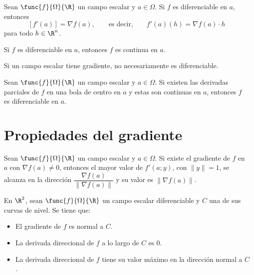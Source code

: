 \documentclass[a4,11pt]{aleph-notas}
\begin{document}
\begin{teo}
    Sean $\func{f}{\Omega}{\R}$ un campo escalar y $a\in \Omega$. Si $f$ es diferenciable en $a$, entonces
    \[
        [f'(a)]=\nabla f(a),\qquad\text{es decir,}\qquad f'(a)(h)=\nabla f(a)\cdot h
    \]
    para todo $h\in\R^n$.
\end{teo}

\begin{teo}
    Si $f$ es diferenciable en $a$, entonces $f$ es continua en $a$.
\end{teo}

\begin{advertencia}
    Si un campo escalar tiene gradiente, no necesariamente es diferenciable.
\end{advertencia}

\begin{teo}
    Sean $\func{f}{\Omega}{\R}$ un campo escalar y $a\in \Omega$. Si existen las derivadas parciales de $f$ en una bola de centro en $a$ y estas son continuas en $a$, entonces $f$ es diferenciable en $a$.
\end{teo}

\section{Propiedades del gradiente}

\begin{prop}
    Sean $\func{f}{\Omega}{\R}$ un campo escalar y $a\in \Omega$. Si existe el gradiente de $f$ en $a$ con $\nabla f(a)\neq 0$, entonces el mayor valor de $f'(a;y)$, con $\|y\|=1$, se alcanza en la dirección $\dfrac{\nabla f(a)}{\|\nabla f(a)\|}$ y su valor es $\|\nabla f(a)\|$.
\end{prop}

\begin{prop}
    En $\R^2$, sean $\func{f}{\Omega}{\R}$ un campo escalar diferenciable y $C$ una de sus curvas de nivel. Se tiene que:
    \begin{itemize}
        \item El gradiente de $f$ es normal a $C$.
        \item La derivada direccional de $f$ a lo largo de $C$ es $0$.
        \item La derivada direccional de $f$ tiene su valor máximo en la dirección normal a $C$.
    \end{itemize}
\end{prop}
\end{document}
